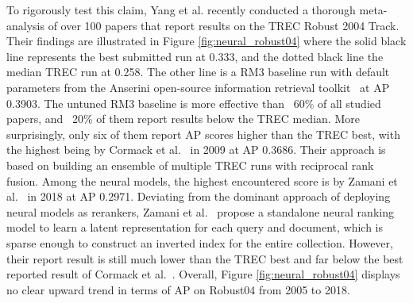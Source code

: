 To rigorously test this claim, Yang et al. \cite{Yang_etal_SIGIR2019} recently conducted a thorough meta-analysis of over 100 papers that report results on the TREC Robust 2004 Track.
Their findings are illustrated in Figure \ref{fig:neural_robust04} where the solid black line represents the best submitted run at 0.333, and the dotted black line the median TREC run at 0.258.
The other line is a RM3 baseline run with default parameters from the Anserini open-source information retrieval toolkit~\cite{Yang:2018:ARR:3289400.3239571} at AP 0.3903.
The untuned RM3 baseline is more effective than ~60\% of all studied papers, and ~20\% of them report results below the TREC median.
More surprisingly, only six of them report AP scores higher than the TREC best, with the highest being by Cormack et al.~\cite{Cormack:2009:RRF:1571941.1572114} in 2009 at AP 0.3686.
Their approach is based on building an ensemble of multiple TREC runs with reciprocal rank fusion.
Among the neural models, the highest encountered score is by Zamani et al.~\cite{zamani2018neural} in 2018 at AP 0.2971.
Deviating from the dominant approach of deploying neural models as rerankers, Zamani et al.~\cite{zamani2018neural} propose a standalone neural ranking model to learn a latent representation for each query and document, which is sparse enough to construct an inverted index for the entire collection.
However, their report result is still much lower than the TREC best and far below the best reported result of Cormack et al.~\cite{Cormack:2009:RRF:1571941.1572114}.
Overall, Figure \ref{fig:neural_robust04} displays no clear upward trend in terms of AP on Robust04 from 2005 to 2018.


